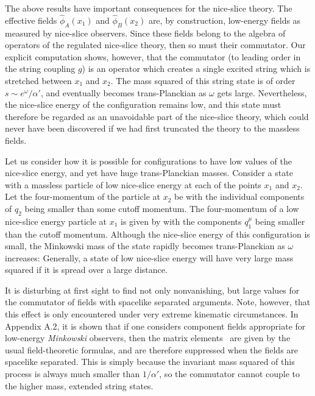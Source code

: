 The above results have important consequences for the nice-slice
theory.  The effective fields ${\hat \phi}_A(x_1)$ and ${\hat
\phi}_B(x_2)$ are, by construction, low-energy fields as measured by
nice-slice observers.  Since these fields belong to the algebra of
operators of the regulated nice-slice theory, then so must their
commutator.  Our explicit computation shows, however, that the
commutator (to leading order in the string coupling $g$) is an
operator which creates a single excited string which is stretched
between $x_1$ and $x_2$.  The mass squared of this string state is of
order
$s \sim e^{\omega}/\alpha'$, and eventually becomes
trans-Planckian as $\omega$ gets large.  Nevertheless, the nice-slice
energy of the configuration remains low, and this state must
therefore be
regarded as an unavoidable part of the nice-slice theory, which could
never have been discovered if we had first truncated the theory to
the massless fields.

Let us consider how it is possible for configurations to have low
values of the nice-slice energy, and yet have huge trans-Planckian
masses.  Consider a state with a massless particle of low nice-slice
energy at each of the points $x_1$ and $x_2$.  Let the four-momentum
of the particle at $x_2$ be
\eqn{}
with the individual components of $q_2$ being smaller than some
cutoff
momentum.
The four-momentum of a low nice-slice energy particle at $x_1$ is
given by
\eqn{}
with the components $q_1^{\mu}$ being smaller than the cutoff
momentum.  Although the nice-slice energy of this configuration is
small, the Minkowski mass of the state rapidly becomes
trans-Planckian as $\omega$ increases:
\eqn{}
Generally, a state of low nice-slice energy will have very large mass
squared if it is spread over a large distance.

It is disturbing at first sight to find not only nonvanishing, but
large values for the commutator of fields with spacelike separated
arguments. Note, however, that this effect is only encountered under
very extreme kinematic circumstances.
In Appendix A.2,
it is shown that if one considers component fields appropriate for
low-energy {\it Minkowski} observers, then the matrix elements
\goobthree\
are given by the usual field-theoretic formulas, and are therefore
suppressed when the fields are spacelike separated.  This is simply
because the
invariant mass squared of this process is always much smaller than
$1/\alpha'$, so the commutator cannot couple to the higher mass,
extended string states.


